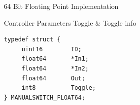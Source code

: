 64 Bit Floating Point Implementation

\begin{XtoCtabular}{Controller Parameters}
Toggle & Toggle info\tabularnewline
\hline
\end{XtoCtabular}

\begin{lstlisting}
typedef struct {
     uint16        ID;
     float64       *In1;
     float64       *In2;
     float64       Out;
     int8          Toggle;
} MANUALSWITCH_FLOAT64;
\end{lstlisting}

\ifdefined \AddTestReports
{}
\fi
